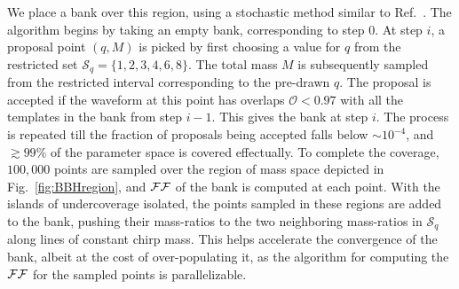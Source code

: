 We place a bank over this region, using a stochastic method similar 
to Ref.~\cite{Harry:2009ea,Ajith:2012mn,Manca:2009xw}. 
The algorithm begins by taking an empty bank,
corresponding to step $0$. At step $i$, a proposal point $(q,M)$ is picked
by first choosing a value for $q$ from the restricted set
$\mathcal{S}_q=\{1,2,3,4,6,8\}$. The total mass $M$ is subsequently sampled
from the restricted interval corresponding to the pre-drawn $q$. The proposal 
is accepted if the waveform at this point has overlaps $\mathcal{O}< 0.97$ 
with all the templates in the bank from step $i-1$. This gives 
the bank at step $i$. The process is repeated till the fraction of 
proposals being accepted falls below $\sim 10^{-4}$, and $\gtrsim 99\%$
of the parameter space is covered effectually.
To complete the coverage, $100,000$ points are sampled over the region of mass
space depicted in Fig.~\ref{fig:BBHregion}, and $\mathcal{FF}$ of the bank
is computed at each point. With the islands of undercoverage isolated, the
points sampled in these regions are added to the bank, pushing their 
mass-ratios to the two neighboring mass-ratios in $\mathcal{S}_q$ 
along lines of constant chirp mass. 
This helps accelerate the convergence of the bank, albeit at the cost of 
over-populating it, as the algorithm for computing the $\mathcal{FF}$ for the 
sampled points is parallelizable.
